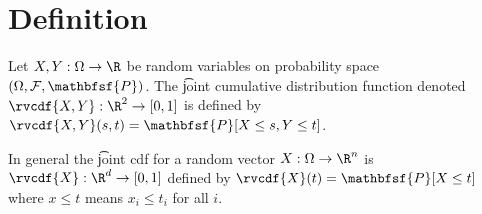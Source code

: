 
\section*{Definition}

Let $X, Y: \Omega  \to \R $ be random variables on probability space $(\Omega , \mathcal{F} , \mathbfsf{P} )$.
The \t{joint cumulative distribution function} denoted $\rvcdf{X,Y}: \R ^2 \to [0, 1]$ is defined by $\rvcdf{X,Y}(s,t) = \mathbfsf{P} [X \leq s, Y \leq t]$.

In general the \t{joint cdf} for a random vector $X: \Omega \to \R ^n$ is $\rvcdf{X}: \R ^d \to [0,1]$ defined by $\rvcdf{X}(t) = \mathbfsf{P} [X \leq t]$ where $x \leq t$ means $x_i \leq t_i$ for all $i$.

\blankpage